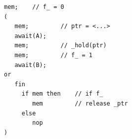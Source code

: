 \documentclass{sigplanconf}
\newcommand{\CEU}{\textsc{C\'{e}u}\xspace}
\newcommand{\code}[1] {{\small{\texttt{#1}}}}
\newcommand{\1}{\;}
\newcommand{\2}{\;\;}
\newcommand{\3}{\;\;\;}
\newcommand{\5}{\;\;\;\;\;}
\begin{document}
\begin{lstlisting}
mem;    // f_ = 0
(
   mem;         // ptr = <...>
   await(A);
   mem;         // _hold(ptr)
   mem;         // f_ = 1
   await(B);
or
   fin
     if mem then    // if f_
        mem         // release _ptr
     else
        nop
)
\end{lstlisting}

\end{document}

